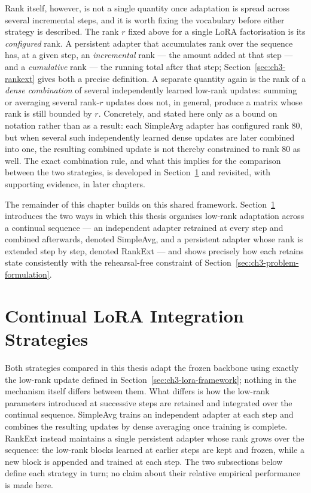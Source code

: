 Rank itself, however, is not a single quantity once adaptation is spread
across several incremental steps, and it is worth fixing the vocabulary
before either strategy is described. The rank $r$ fixed above for a single
LoRA factorisation is its \emph{configured} rank. A persistent adapter that
accumulates rank over the sequence has, at a given step, an \emph{incremental}
rank --- the amount added at that step --- and a \emph{cumulative} rank --- the
running total after that step; Section~\ref{sec:ch3-rankext} gives both a precise
definition. A separate quantity again is the rank of a \emph{dense combination}
of several independently learned low-rank updates: summing or averaging
several rank-$r$ updates does not, in general, produce a matrix whose rank
is still bounded by $r$. Concretely, and stated here only as a bound on
notation rather than as a result: each SimpleAvg adapter has configured
rank 80, but when several such independently learned dense updates are
later combined into one, the resulting combined update is not thereby
constrained to rank 80 as well.
The exact combination rule, and what this implies for the comparison
between the two strategies, is developed in Section~\ref{sec:ch3-integration-strategies} and revisited,
with supporting evidence, in later chapters.

The remainder of this chapter builds on this shared framework. Section~\ref{sec:ch3-integration-strategies}
introduces the two ways in which this thesis organises low-rank adaptation
across a continual sequence --- an independent adapter retrained at every
step and combined afterwards, denoted SimpleAvg, and a persistent adapter
whose rank is extended step by step, denoted RankExt --- and shows precisely
how each retains state consistently with the rehearsal-free constraint of
Section~\ref{sec:ch3-problem-formulation}.

\section{Continual LoRA Integration Strategies}
\label{sec:ch3-integration-strategies}

Both strategies compared in this thesis adapt the frozen backbone using
exactly the low-rank update defined in Section~\ref{sec:ch3-lora-framework}; nothing in the
mechanism itself differs between them. What differs is how the low-rank
parameters introduced at successive steps are retained and integrated over
the continual sequence. SimpleAvg trains an independent adapter at each
step and combines the resulting updates by dense averaging once training
is complete. RankExt instead maintains a single persistent adapter whose
rank grows over the sequence: the low-rank blocks learned at earlier steps
are kept and frozen, while a new block is appended and trained at each
step. The two subsections below define each strategy in turn; no claim
about their relative empirical performance is made here.

